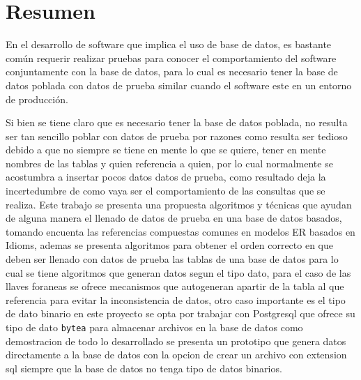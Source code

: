 \chapter*{Resumen}
\thispagestyle{empty}
\renewcommand{\footrulewidth}{0.0pt}%
En el desarrollo de software que implica el uso de base de datos, es bastante com\'un requerir realizar pruebas para conocer el comportamiento del software conjuntamente con la base de datos, para lo cual es necesario tener la base de datos poblada con datos de prueba similar cuando el software este en un entorno de producci\'on. 

Si bien se tiene claro que es necesario tener la base de datos poblada, no resulta ser tan sencillo poblar con datos de prueba por razones como resulta ser tedioso debido a que no siempre se tiene en mente lo que se quiere, tener en mente nombres de las tablas y quien referencia a quien, por lo cual normalmente se acostumbra a insertar pocos datos datos de prueba, como resultado deja la incertedumbre de como vaya ser el comportamiento de las consultas que se realiza. Este trabajo se presenta una propuesta algoritmos y t\'ecnicas  que ayudan de alguna manera el llenado de datos de prueba en una base de datos basados, tomando encuenta las referencias compuestas comunes en modelos ER basados en Idioms, ademas se presenta algoritmos para obtener el orden correcto en que deben ser llenado con datos de prueba las tablas de una base de datos para lo cual se tiene algoritmos que generan datos segun el tipo dato, para el caso de las llaves foraneas se ofrece mecanismos que autogeneran apartir de la tabla al que referencia para evitar la inconsistencia de datos, otro caso importante es el tipo de dato binario en este proyecto se opta por trabajar con Postgresql que ofrece su tipo de dato \texttt{bytea} para almacenar archivos en la base de datos como demostracion de todo lo desarrollado se presenta un prototipo que genera datos directamente a la base de datos con la opcion de crear un archivo con extension sql siempre que la base de datos no tenga tipo de datos binarios.
